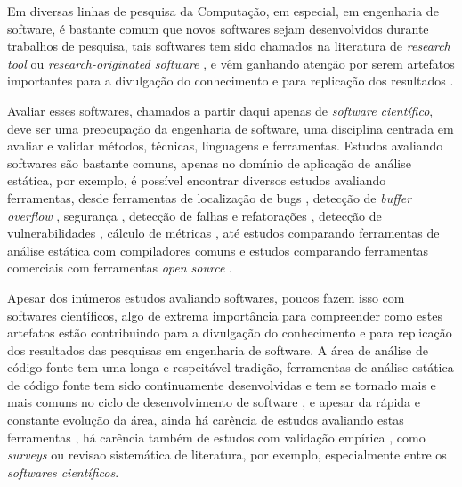 
Em diversas linhas de pesquisa da Computação, em especial, em engenharia de
software, é bastante comum que novos softwares sejam desenvolvidos durante
trabalhos de pesquisa, tais softwares tem sido chamados na literatura de {\it
research tool} \cite{Portillo12} ou {\it research-originated software}
\cite{Kon2011}, e vêm ganhando atenção por serem artefatos importantes para a
divulgação do conhecimento e para replicação dos resultados \cite{Stodden2009}.

Avaliar esses softwares, chamados a partir daqui apenas de {\it software
científico}, deve ser uma preocupação da engenharia de software, uma disciplina
centrada em avaliar e validar métodos, técnicas, linguagens e ferramentas.
Estudos avaliando softwares são bastante comuns, apenas no domínio
de aplicação de análise estática, por exemplo, é possível encontrar diversos estudos
avaliando ferramentas, desde ferramentas de localização de bugs \cite{Rutar2004}, detecção
de {\it buffer overflow} \cite{Kratkiewicz2005}, segurança \cite{Okun2007,
Johns2011}, detecção de falhas e refatorações \cite{Wedyan2009}, detecção de
vulnerabilidades \cite{Li2010, Ataide2014}, cálculo de métricas
\cite{Alemerien2013}, até estudos comparando ferramentas de análise estática
com compiladores comuns \cite{Emanuelsson2008} e estudos comparando ferramentas
comerciais com ferramentas {\it open source} \cite{Al2010}.


Apesar dos inúmeros estudos avaliando softwares, poucos fazem isso com
softwares científicos, algo de extrema importância para compreender como estes
artefatos estão contribuindo para a divulgação do conhecimento e para
replicação dos resultados das pesquisas em engenharia de software. A área de
análise de código fonte tem uma longa e respeitável tradição, ferramentas de
análise estática de código fonte tem sido continuamente desenvolvidas e tem se
tornado mais e mais comuns no ciclo de desenvolvimento de software
\cite{Novak2010}, e apesar da rápida e constante evolução da área, ainda há
carência de estudos avaliando estas ferramentas \cite{Li2010}, há carência
também de estudos com validação empírica \cite{ilyas2016static}, como {\it
surveys} ou revisao sistemática de literatura, por exemplo, especialmente entre
os {\it softwares científicos}.


